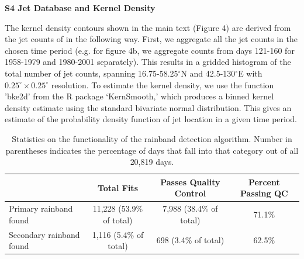 \documentclass[final,grl]{agutexSI}
\begin{document}
\begin{article}
\vspace{5mm}

\noindent\textbf{{\Large S4 Jet Database and Kernel Density}}

\vspace{2mm}

The kernel density contours shown in the main text (Figure 4) are derived from the jet counts of \citet{Schiemann2009} in the following way. First, we aggregate all the jet counts in the chosen time period (e.g. for figure 4b, we aggregate counts from days 121-160 for 1958-1979 and 1980-2001 separately). This results in a gridded histogram of the total number of jet counts, spanning 16.75-58.25$^{\circ}$N and 42.5-130$^{\circ}$E with $0.25^{\circ} \times 0.25^{\circ}$ resolution. To estimate the kernel density, we use the function 'bke2d' from the R package `KernSmooth,' which produces a binned kernel density estimate using the standard bivariate normal distribution. This gives an estimate of the probability density function of jet location in a given time period. 



%
%


\end{article}

\clearpage


\begin{table}

\caption{Statistics on the functionality of the rainband detection algorithm. Number in parentheses indicates the percentage of days that fall into that category out of all 20,819 days.}
\centering

\begin{tabular}{ l c c c}
	  & Total Fits & Passes Quality Control & Percent Passing QC\\
	 \hline
	 Primary rainband found & 11,228 (53.9\% of total) & 7,988 (38.4\% of total) & 71.1\% \\
	 Secondary rainband found & 1,116 (5.4\% of total) & 698 (3.4\% of total) & 62.5\% \\
\end{tabular}
\label{ts1}
\end{table}
\end{document}

